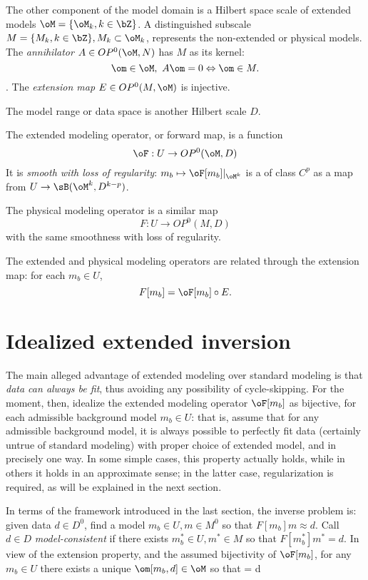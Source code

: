 The other component of the model domain is a Hilbert space scale of extended
models $\oM =\{\oM_k, k\in \bZ\}$. 
A distinguished subscale $M = \{M_k, k\in \bZ\}, M_k \subset \oM_k$,
represents the non-extended or physical models. 
The  {\em annihilator} $A \in OP^0(\oM,N)$ has $M$ as its kernel:
\begin{equation}
\label{eqn:ann}
\om \in \oM,\,\,A\om=0 \Leftrightarrow \om \in M.
\end{equation}.
The {\em extension map} $E \in OP^0(M,\oM)$ is injective.

The model range or data space is another Hilbert scale $D$.

The extended modeling operator, or forward map, is a function
\[
\oF: U \rightarrow OP^0(\oM,D)
\]
It is {\em smooth with loss of regularity}: $m_b \mapsto \oF[m_b]|_{\oM^k}$ is a 
of class $C^p$ as a map from $U \rightarrow \sB(\oM^k,D^{k-p})$.

The physical modeling operator is a similar map
\[
F:U \rightarrow OP^0(M,D)
\]
with the same smoothness with loss of regularity. 

The extended and physical modeling operators are related through the
extension map: for each $m_b \in U$,
\[
F[m_b] = \oF[m_b] \circ E.
\]

\section{Idealized extended inversion}
The main alleged advantage of extended modeling over standard modeling
is that {\em data can always be fit}, thus avoiding any possibility of
cycle-skipping. For the moment, then, idealize the extended modeling
operator $\oF[m_b]$ as bijective, for each admissible
background model $m_b \in U$: that is, assume that for any admissible
background model, it is always possible to perfectly fit data (certainly untrue
of standard modeling) with proper choice of extended model, and in
precisely one way. In some simple cases, this property actually holds,
while in others it holds in an approximate sense; in the latter case,
regularization is required, as will be explained in the next section.

In terms of the framework introduced in the last section, the inverse
problem is: given data $d \in D^0$, find a model $m_b \in U, m \in M^0$ so that
$F[m_b]m \approx d$. 
Call $d \in D$ {\em model-consistent} if there
exists $m_b^* \in U, m^* \in M$ so that $F[m_b^*]m^*=d$. 
In view of the extension property, and the assumed
bijectivity of $\oF[m_b]$, for any $m_b \in U$ there exists a unique
$\om[m_b,d] \in \oM$ so that
\be
\label{eqn:perfect}
\oF[m_b]\om[m_b,d] = d
\ee

